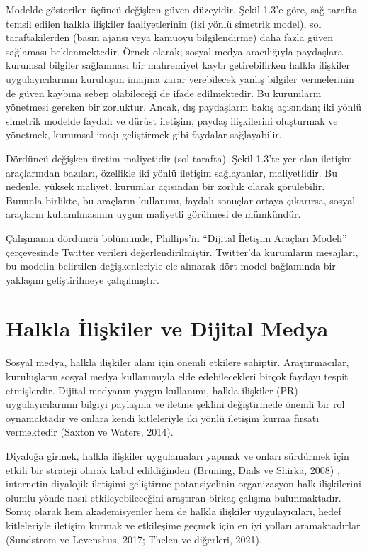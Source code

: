 \documentclass[
]{book}
\begin{document}
Modelde gösterilen üçüncü değişken güven düzeyidir. Şekil 1.3'e göre, sağ tarafta temsil edilen halkla ilişkiler faaliyetlerinin (iki yönlü simetrik model), sol taraftakilerden (basın ajansı veya kamuoyu bilgilendirme) daha fazla güven sağlaması beklenmektedir. Örnek olarak; sosyal medya aracılığıyla paydaşlara kurumsal bilgiler sağlanması bir mahremiyet kaybı getirebilirken halkla ilişkiler uygulayıcılarının kuruluşun imajına zarar verebilecek yanlış bilgiler vermelerinin de güven kaybına sebep olabileceği de ifade edilmektedir. Bu kurumların yönetmesi gereken bir zorluktur. Ancak, dış paydaşların bakış açısından; iki yönlü simetrik modelde faydalı ve dürüst iletişim, paydaş ilişkilerini oluşturmak ve yönetmek, kurumsal imajı geliştirmek gibi faydalar sağlayabilir.

Dördüncü değişken üretim maliyetidir (sol tarafta). Şekil 1.3'te yer alan iletişim araçlarından bazıları, özellikle iki yönlü iletişim sağlayanlar, maliyetlidir. Bu nedenle, yüksek maliyet, kurumlar açısından bir zorluk olarak görülebilir. Bununla birlikte, bu araçların kullanımı, faydalı sonuçlar ortaya çıkarırsa, sosyal araçların kullanılmasının uygun maliyetli görülmesi de mümkündür.

Çalışmanın dördüncü bölümünde, Phillips'in ``Dijital İletişim Araçları Modeli'' çerçevesinde Twitter verileri değerlendirilmiştir. Twitter'da kurumların mesajları, bu modelin belirtilen değişkenleriyle ele alınarak dört-model bağlamında bir yaklaşım geliştirilmeye çalışılmıştır.

\hypertarget{halkla-iliux15fkiler-ve-dijital-medya}{%
\section{Halkla İlişkiler ve Dijital Medya}\label{halkla-iliux15fkiler-ve-dijital-medya}}

Sosyal medya, halkla ilişkiler alanı için önemli etkilere sahiptir. Araştırmacılar, kuruluşların sosyal medya kullanımıyla elde edebilecekleri birçok faydayı tespit etmişlerdir. Dijital medyanın yaygın kullanımı, halkla ilişkiler (PR) uygulayıcılarının bilgiyi paylaşma ve iletme şeklini değiştirmede önemli bir rol oynamaktadır \citep{komodromos2014study} ve onlara kendi kitleleriyle iki yönlü iletişim kurma fırsatı vermektedir (Saxton ve Waters, 2014). \citep{saxton2014stakeholders}

Diyaloğa girmek, halkla ilişkiler uygulamaları yapmak ve onları sürdürmek için etkili bir strateji olarak kabul edildiğinden (Bruning, Dials ve Shirka, 2008) \citep{bruning2008using}, internetin diyalojik iletişimi geliştirme potansiyelinin organizasyon-halk ilişkilerini olumlu yönde nasıl etkileyebileceğini araştıran birkaç çalışma bulunmaktadır. \citep{kelleher2009conversational, kent1998building} Sonuç olarak hem akademisyenler hem de halkla ilişkiler uygulayıcıları, hedef kitleleriyle iletişim kurmak ve etkileşime geçmek için en iyi yolları aramaktadırlar (Sundstrom ve Levenshus, 2017; Thelen ve diğerleri, 2021). \citep{sundstrom2017art}
\end{document}
